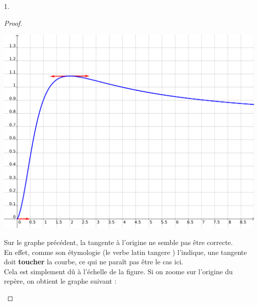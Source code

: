 \begin{noliste}{1.}
  \begin{proof}~
    \begin{center}
    
      
\includegraphics[scale=.25]{Figures/EML_2018/geogebra_EML_2018.png}
      
    \end{center}
    
    \begin{remark}
      Sur le graphe précédent, la tangente à l'origine ne semble pas
      être correcte.\\
      En effet, comme son étymologie (le verbe latin \og tangere
      \fg{}) l'indique, une tangente doit {\bf toucher} la courbe, ce
      qui ne paraît pas être le cas ici.\\
      Cela est simplement dû à l'échelle de la figure. Si on zoome sur
      l'origine du repère, on obtient le graphe suivant :
      \begin{center}
        

\end{center}
\end{remark}
\end{proof}
\end{noliste}

